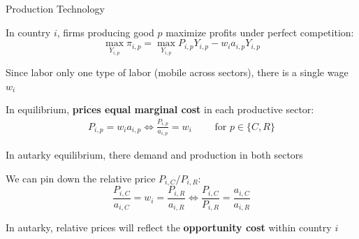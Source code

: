 \documentclass[notes,11pt, aspectratio=169, xcolor=table]{beamer}
\newenvironment{wideitemize}{\itemize\addtolength{\itemsep}{10pt}}{\enditemize}
\begin{document}
\begin{frame}{Production Technology}
\begin{wideitemize}
        \item In country $i$, firms producing good $p$ maximize profits under perfect competition:
        \begin{equation*}
            \max_{Y_{i,p}} \pi_{i,p} = \max_{Y_{i,p}} P_{i,p}Y_{i,p} - w_i a_{i,p} Y_{i,p} 
        \end{equation*}
        \item Since labor only one type of labor (mobile across sectors), there is a single wage $w_i$
        \item In equilibrium, \textbf{prices equal marginal cost} in each productive sector:
        \begin{eqnarray*}
            P_{i,p} = w_i a_{i,p} \iff \frac{P_{i,p}}{a_{i,p}} = w_i  \qquad \text{ for } p \in\{C,R\}
        \end{eqnarray*}
        \item In autarky equilibrium, there demand and production in both sectors
        \item We can pin down the relative price $P_{i,C} / P_{i,R}$:
        \begin{equation*}
            \frac{P_{i,C}}{a_{i,C}} = w_i = \frac{P_{i,R}}{a_{i,R}} \iff \frac{P_{i,C}}{P_{i,R}} = \frac{a_{i,C}}{a_{i,R}}  
        \end{equation*}
    \item In autarky, relative prices will reflect the \textbf{opportunity cost} within country $i$
    \end{wideitemize}
\end{frame}
\end{document}
